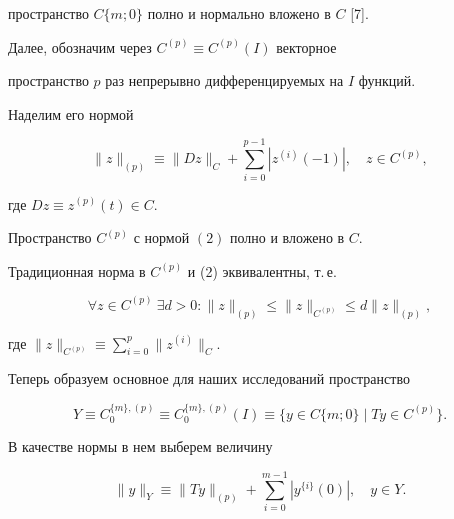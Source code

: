 пространство $C\{m;0\}$ полно и нормально вложено в $C$ [7]. 


 


Далее, обозначим через $C^{(p)}\equiv C^{(p)}(I)$ векторное 


пространство $p$ раз непрерывно дифференцируемых на $I$ функций. 


Наделим его нормой 


\begin{equation} 


\|z\|_{(p)}\equiv\|D z\|_C+\sum^{p-1}_{i=0}|z^{(i)}(-1)|,\quad 


z\in C^{(p)}, 


\end{equation} 


где $D z\equiv z^{(p)}(t)\in C$. 


 


\begin{lem} 


Пространство $C^{(p)}$ с нормой $(2)$ полно и вложено в $C$. 


\end{lem} 


 


\begin{cor} 


Традиционная норма в $C^{(p)}$ и (2) эквивалентны, т.\,е. 


$$ 


\forall z\in C^{(p)}\ \exists d>0:\|z\|_{(p)}\le 


\|z\|_{C^{(p)}}\le d\|z\|_{(p)}, 


$$ 


где $\|z\|_{C^{(p)}}\equiv\sum\limits^p_{i=0}\|z^{(i)}\|_C$. 


\end{cor} 


 


Теперь образуем основное для наших исследований пространство 


$$ 


Y\equiv C^{\{m\},(p)}_0\equiv C^{\{m\},(p)}_0(I)\equiv 


\{y\in C\{m;0\}\mid T y\in C^{(p)}\}. 


$$ 


В качестве нормы в нем выберем величину 


\begin{equation} 


\|y\|_Y\equiv\|T y\|_{(p)}+\sum^{m-1}_{i=0}|y^{\{i\}}(0)|,\quad 


y\in Y. 


\end{equation} 


